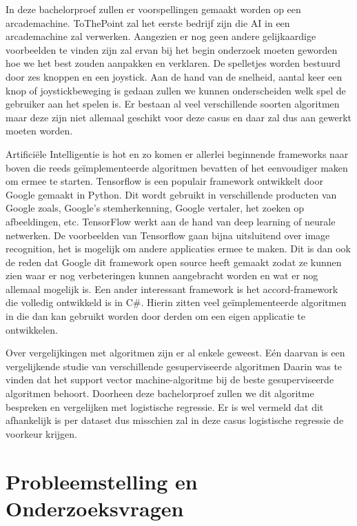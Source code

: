 In deze bachelorproef zullen er voorspellingen gemaakt worden op een arcademachine. ToThePoint zal het eerste bedrijf zijn die AI in een arcademachine zal verwerken. Aangezien er nog geen andere gelijkaardige voorbeelden te vinden zijn zal ervan bij het begin onderzoek moeten geworden hoe we het best zouden aanpakken en verklaren. De spelletjes worden bestuurd door zes knoppen en een joystick. Aan de hand van de snelheid, aantal keer een knop of joystickbeweging is gedaan zullen we kunnen onderscheiden welk spel de gebruiker aan het spelen is. Er bestaan al veel verschillende soorten algoritmen maar deze zijn niet allemaal geschikt voor deze casus en daar zal dus aan gewerkt moeten worden. 

Artificiële Intelligentie is hot en zo komen er allerlei beginnende frameworks naar boven die reeds geïmplementeerde algoritmen bevatten of het eenvoudiger maken om ermee te starten. 
Tensorflow is een populair framework ontwikkelt door Google gemaakt in Python. Dit wordt gebruikt in verschillende producten van Google zoals, Google's stemherkenning, Google vertaler, het zoeken op afbeeldingen, etc.
TensorFlow werkt aan de hand van deep learning of neurale netwerken. De voorbeelden van Tensorflow gaan bijna uitsluitend over image recognition, het is mogelijk om andere applicaties ermee te maken. Dit is dan ook de reden dat Google dit framework open source heeft gemaakt zodat ze kunnen zien waar er nog verbeteringen kunnen aangebracht worden en wat er nog allemaal mogelijk is.
Een ander interessant framework is het accord-framework \autocite{accord} die volledig ontwikkeld is in C\#. Hierin zitten veel geïmplementeerde algoritmen in die dan kan gebruikt worden door derden om een eigen applicatie te ontwikkelen. 

Over vergelijkingen met algoritmen zijn er al enkele geweest. Eén daarvan is een vergelijkende studie van verschillende gesuperviseerde algoritmen \autocite{vergelijkingSupervised} Daarin was te vinden dat het support vector machine-algoritme bij de beste gesuperviseerde algoritmen behoort. Doorheen deze bachelorproef zullen we dit algoritme bespreken en vergelijken met logistische regressie. Er is wel vermeld dat dit afhankelijk is per dataset dus misschien zal in deze casus logistische regressie de voorkeur krijgen.

\section{Probleemstelling en Onderzoeksvragen}
\label{sec:onderzoeksvragen}

